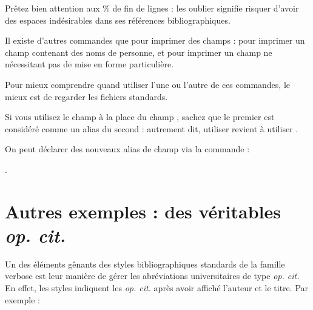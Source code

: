 \begin{latexcode}
\end{latexcode}





Prêtez bien attention aux \% de fin de lignes : les oublier signifie risquer d'avoir des espaces indésirables dans ses références bibliographiques.


\begin{plusloins}

Il  existe d'autres commandes que  pour imprimer des champs :  pour imprimer un champ contenant des noms de personne, et  pour imprimer un champ ne nécessitant pas de mise en forme particulière.

Pour mieux comprendre quand utiliser l'une ou l'autre de ces commandes, le mieux est de regarder les fichiers standards.

\end{plusloins}
\begin{plusloins}
Si vous utilisez le champ  à la place du champ , sachez que le premier est considéré comme un alias du second : autrement dit, utiliser  revient à utiliser .

On peut déclarer des nouveaux alias de champ via la commande :

 .
\end{plusloins}

\section{Autres exemples : des véritables \emph{op. cit.}}

Un des éléments gênants des styles bibliographiques standards de la famille verbose est leur manière de gérer les abréviations universitaires de type \emph{op. cit.} En effet, les styles indiquent les \emph{op. cit.} après avoir affiché l'auteur et le titre. Par exemple :

\begin{quotation}
\bibverbose	
\cite{Urner1952}

\cite{Saxer1980}
\bibverbosetrad

\cite{Urner1952}

\cite{Saxer1980}
\end{quotation}

